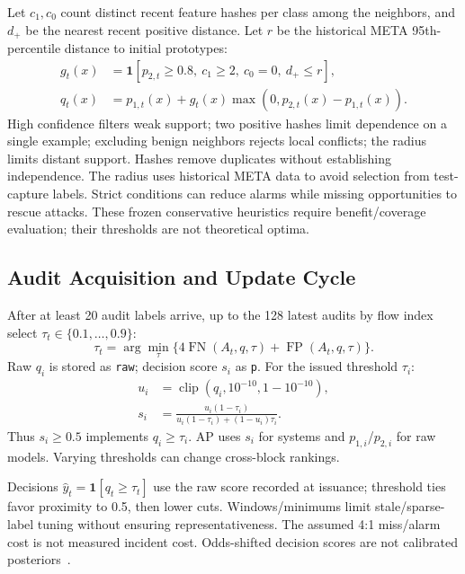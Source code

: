 \documentclass[conference]{IEEEtran}
\newcommand{\ind}{\mathbf{1}}
\begin{document}
Let $c_1,c_0$ count distinct recent feature hashes per class among the neighbors, and $d_+$ be the nearest recent positive distance. Let $r$ be the historical META 95th-percentile distance to initial prototypes:
\begin{align}
 g_t(x)&=\ind[p_{2,t}\ge0.8,\ c_1\ge2,\ c_0=0,\ d_+\le r],\label{eq:gate}\\
 q_t(x)&=p_{1,t}(x)+g_t(x)\max(0,p_{2,t}(x)-p_{1,t}(x)).\label{eq:raw}
\end{align}
High confidence filters weak support; two positive hashes limit dependence on a single example; excluding benign neighbors rejects local conflicts; the radius limits distant support. Hashes remove duplicates without establishing independence. The radius uses historical META data to avoid selection from test-capture labels. Strict conditions can reduce alarms while missing opportunities to rescue attacks. These frozen conservative heuristics require benefit/coverage evaluation; their thresholds are not theoretical optima.

\subsection{Audit Acquisition and Update Cycle}
After at least 20 audit labels arrive, up to the 128 latest audits by flow index select $\tau_t\in\{0.1,\ldots,0.9\}$:
\begin{equation}
 \tau_t=\arg\min_\tau\{4\operatorname{FN}(A_t,q,\tau)+\operatorname{FP}(A_t,q,\tau)\}.\label{eq:threshold}
\end{equation}
Raw $q_i$ is stored as \texttt{raw}; decision score $s_i$ as \texttt{p}. For the issued threshold $\tau_i$:
\begin{align}
 u_i&=\operatorname{clip}(q_i,10^{-10},1-10^{-10}),\nonumber\\
 s_i&=\frac{u_i(1-\tau_i)}{u_i(1-\tau_i)+(1-u_i)\tau_i}.\label{eq:issued}
\end{align}
Thus $s_i\ge0.5$ implements $q_i\ge\tau_i$. AP uses $s_i$ for systems and $p_{1,i}$/$p_{2,i}$ for raw models. Varying thresholds can change cross-block rankings.

Decisions $\hat y_t=\ind[q_t\ge\tau_t]$ use the raw score recorded at issuance; threshold ties favor proximity to 0.5, then lower cuts. Windows/minimums limit stale/sparse-label tuning without ensuring representativeness. The assumed 4:1 miss/alarm cost is not measured incident cost. Odds-shifted decision scores are not calibrated posteriors~\cite{guo}.
\end{document}
